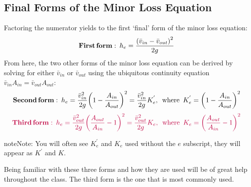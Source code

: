\documentclass[letterpaper,10pt,english]{sphinxmanual}
\begin{document}
\subsection{Final Forms of the Minor Loss Equation}
\label{\detokenize{Fluids_Review/Fluids_Review_Derivations:final-forms-of-the-minor-loss-equation}}\label{\detokenize{Fluids_Review/Fluids_Review_Derivations:final-minor-loss-equations}}
Factoring the numerator yields to the first ‘final’ form of the minor loss equation:
\begin{equation}\label{equation:Fluids_Review/Fluids_Review_Derivations:Fluids_Review/Fluids_Review_Derivations:12}
\begin{split}{\rm{ \mathbf{First \, form:} }} \,\,\, h_e = \frac{\left( \bar v_{in}  - \bar v_{out} \right)^2}{2g}\end{split}
\end{equation}
From here, the two other forms of the minor loss equation can be derived by solving for either \(\bar v_{in}\) or \(\bar v_{out}\) using the ubiquitous continuity equation \(\bar v_{in} A_{in} = \bar v_{out} A_{out}\):
\begin{equation}\label{equation:Fluids_Review/Fluids_Review_Derivations:Fluids_Review/Fluids_Review_Derivations:13}
\begin{split}{\rm{ \mathbf{Second \, form:} }} \,\,\, h_e = \frac{\bar v_{in}^2}{2g}{\left( {1 - \frac{A_{in}}{A_{out}}} \right)^2} = \frac{\bar v_{in}^2}{2g} K_e^{'}, {\rm \, \, \, where \, \, \,} K_e^{'} = \left( 1 - \frac{A_{in}}{A_{out}} \right)^2\end{split}
\end{equation}\begin{equation}\label{equation:Fluids_Review/Fluids_Review_Derivations:minor_loss_equation}
\begin{split}   \color{purple}{
   {\rm{ \mathbf{Third \, form:} }} \,\,\, h_e = \frac{\bar  v_{out}^2}{2g}{\left( {\frac{A_{out}}{A_{in}}} -1 \right)^2} = \frac{\bar v_{out}^2}{2g} K_e, {\rm \, \, \, where \, \, \,} K_e = \left( \frac{A_{out}}{A_{in}} - 1 \right)^2
   }\end{split}
\end{equation}
\begin{sphinxadmonition}{note}{Note:}
You will often see \(K_e^{'}\) and \(K_e\) used without the \(e\) subscript, they will appear as \(K^{'}\) and \(K\).
\end{sphinxadmonition}

Being familiar with these three forms and how they are used will be of great help throughout the class. The third form is the one that is most commonly used.
\end{document}
